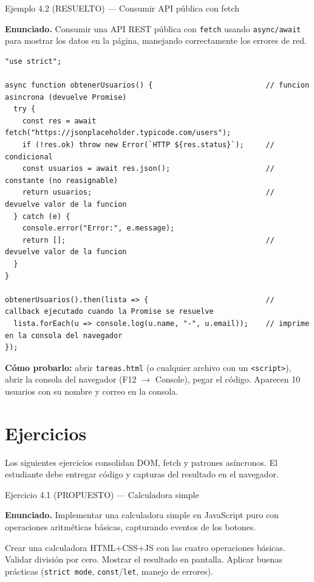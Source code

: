 \documentclass[11pt,a4paper,openany]{book}
\begin{document}
\begin{cajaejemplo}{Ejemplo 4.2 (RESUELTO) --- Consumir API pública con fetch}

\textbf{Enunciado.} Consumir una API REST pública con \texttt{fetch} usando \texttt{async/await} para mostrar los datos en la página, manejando correctamente los errores de red.

\begin{lstlisting}[style=js,caption={api.js},label=lst:4.6]
"use strict";

async function obtenerUsuarios() {                          // funcion asincrona (devuelve Promise)
  try {
    const res = await fetch("https://jsonplaceholder.typicode.com/users");
    if (!res.ok) throw new Error(`HTTP ${res.status}`);     // condicional
    const usuarios = await res.json();                      // constante (no reasignable)
    return usuarios;                                        // devuelve valor de la funcion
  } catch (e) {
    console.error("Error:", e.message);
    return [];                                              // devuelve valor de la funcion
  }
}

obtenerUsuarios().then(lista => {                           // callback ejecutado cuando la Promise se resuelve
  lista.forEach(u => console.log(u.name, "-", u.email));    // imprime en la consola del navegador
});
\end{lstlisting}

\textbf{Cómo probarlo:} abrir \texttt{tareas.html} (o cualquier
archivo con un \texttt{<script>}), abrir la consola del navegador
(F12 $\rightarrow$ Console), pegar el código. Aparecen 10 usuarios
con su nombre y correo en la consola.
\end{cajaejemplo}

\section{Ejercicios}

Los siguientes ejercicios consolidan DOM, fetch y patrones
asíncronos. El estudiante debe entregar código y capturas del
resultado en el navegador.


\begin{cajaejercicio}{Ejercicio 4.1 (PROPUESTO) --- Calculadora simple}


\textbf{Enunciado.} Implementar una calculadora simple en JavaScript puro con operaciones aritméticas básicas, capturando eventos de los botones.

Crear una calculadora HTML+CSS+JS con las cuatro operaciones básicas.
Validar división por cero. Mostrar el resultado en pantalla. Aplicar
buenas prácticas (\texttt{strict mode}, \texttt{const}/\texttt{let},
manejo de errores).
\end{cajaejercicio}
\end{document}
